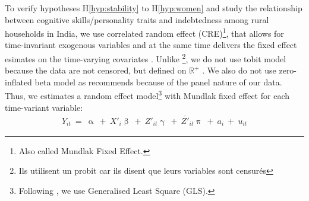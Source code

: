 \documentclass[a4paper, 11pt, onecolumn]{article}
\begin{document}
To verify hypotheses H\ref{hyp:stability} to H\ref{hyp:women} and study the relationship between cognitive skills/personality traits and indebtedness among rural households in India, we use correlated random effect (CRE)\footnote{Also called Mundlak Fixed Effect.}, that allows for time-invariant exogenous variables and at the same time delivers the fixed effect esimates on the time-varying covariates \citep{Mundlak1978, Wooldridge2010, Wooldridge2013, Schunck2013}.
Unlike \cite{Brown2014}\footnote{Ils utilisent un probit car ils disent que leurs variables sont censurés}, we do not use tobit model because the data are not censored, but defined on $\mathbb{R}^{+}$ \citep{Maddala1991}.
We also do not use zero-inflated beta model as \cite{Cook2008} recommends because of the panel nature of our data.
Thus, we estimates a random effect model\footnote{Following \cite{Schunck2013, Wooldridge2013}, we use Generalised Least Square (GLS).} with Mundlak fixed effect for each time-variant variable:
\begin{equation}\label{eq:CRE}
\begin{split}
Y_{it}~=~\upalpha~+~X'_i\upbeta~+~Z'_{it}\upgamma~+~\overline{Z'}_{it}\uppi~+~a_i~+~u_{it}
\end{split}
\end{equation}

\end{document}
